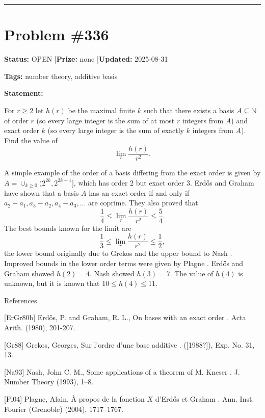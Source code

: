 \documentclass{article}
\begin{document}
\noindent\rule{\linewidth}{0.4pt}


\section{Problem \#336}
\label{prob:336}

\noindent\textbf{Status:} OPEN \quad|\quad \textbf{Prize:} none \quad|\quad \textbf{Updated:} 2025-08-31

\noindent\textbf{Tags:} number theory, additive basis

\medskip

\noindent\textbf{Statement:}

For $r\geq 2$ let $h(r)$ be the maximal finite $k$ such that there exists a basis $A\subseteq \mathbb{N}$ of order $r$ (so every large integer is the sum of at most $r$ integers from $A$) and exact order $k$ (so every large integer is the sum of exactly $k$ integers from $A$). Find the value of\[\lim_r \frac{h(r)}{r^2}.\]




A simple example of the order of a basis differing from the exact order is given by $A=\cup_{k\geq 0}(2^{2k},2^{2k+1}]$, which has order $2$ but exact order $3$. Erd\H{o}s and Graham \cite{ErGr80b} have shown that a basis $A$ has an exact order if and only if $a_2-a_1,a_3-a_2,a_4-a_3,\ldots$ are coprime. They also proved that\[\frac{1}{4}\leq \lim_r \frac{h(r)}{r^2}\leq \frac{5}{4}.\]The best bounds known for the limit are\[\frac{1}{3}\leq \lim_r \frac{h(r)}{r^2}\leq \frac{1}{2},\]the lower bound originally due to Grekos \cite{Gr88} and the upper bound to Nash \cite{Na93}. Improved bounds in the lower order terms were given by Plagne \cite{Pl04}. Erd\H{o}s and Graham \cite{ErGr80b} showed $h(2)=4$. Nash \cite{Na93} showed $h(3)=7$. The value of $h(4)$ is unknown, but it is known \cite{Pl04} that $10\leq h(4)\leq 11$.




References

[ErGr80b] Erd\H{o}s, P. and Graham, R. L., On bases with an exact order . Acta Arith. (1980), 201-207.

[Gr88] Grekos, Georges, Sur l'ordre d'une base additive . ([1988?]), Exp. No. 31, 13.

[Na93] Nash, John C. M., Some applications of a theorem of {M}. {K}neser . J. Number Theory (1993), 1--8.

[Pl04] Plagne, Alain, \`A{} propos de la fonction {$X$} d'{E}rd\H{o}s et {G}raham . Ann. Inst. Fourier (Grenoble) (2004), 1717--1767.
\end{document}
